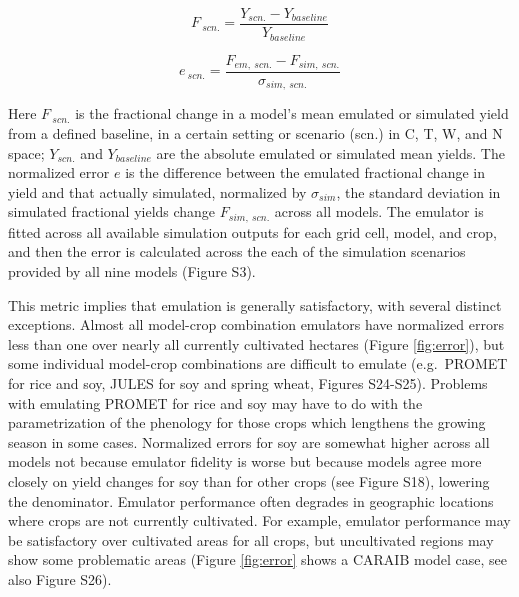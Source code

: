 \documentclass[esd, manuscript]{copernicus} %
\begin{document}
\begin{equation}
    \label{eqn:per_yield}
    F_{\: scn.}=\frac{Y_{scn.}-Y_{baseline}}{Y_{baseline}}
\end{equation}

\begin{equation}
    \label{eqn:error}
    e_{\: scn.} =\frac{F_{em, \: scn.}-F_{sim, \: scn.}}{\sigma_{sim, \: scn.}}
\end{equation}

Here $F_{\: scn.}$ is the fractional change in a model's mean emulated or simulated yield from a defined baseline, in a certain setting or scenario (scn.) in C, T, W, and N space; $Y_{scn.}$ and $Y_{baseline}$ are the absolute emulated or simulated mean yields. The normalized error $e$ is the difference between the emulated fractional change in yield and that actually simulated, normalized by $\sigma_{sim}$, the standard deviation in simulated fractional yields change $F_{sim,\: scn.}$ across all models. The emulator is fitted across all available simulation outputs for each grid cell, model, and crop, and then the error is calculated across the each of the simulation scenarios provided by all nine models (Figure S3). 

This metric implies that emulation is generally satisfactory, with several distinct exceptions. Almost all model-crop combination emulators have normalized errors less than one over nearly all currently cultivated hectares (Figure \ref{fig:error}), but some individual model-crop combinations are difficult to emulate (e.g.\ PROMET for rice and soy, JULES for soy and spring wheat, Figures S24-S25). Problems with emulating PROMET for rice and soy may have to do with the parametrization of the phenology for those crops which lengthens the growing season in some cases. Normalized errors for soy are somewhat higher across all models not because emulator fidelity is worse but because models agree more closely on yield changes for soy than for other crops (see Figure S18), lowering the denominator. Emulator performance often degrades in geographic locations where crops are not currently cultivated. For example, emulator performance may be satisfactory over cultivated areas for all crops, but uncultivated regions may show some problematic areas (Figure \ref{fig:error} shows a CARAIB model case, see also Figure S26).
\end{document}
